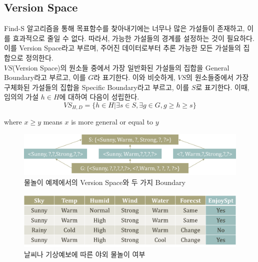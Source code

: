 \documentclass[a4paper]{oblivoir}
\begin{document}
\subsection{Version Space}
Find-S 알고리즘을 통해 목표함수를 찾아내기에는 너무나 많은 가설들이 존재하고, 이를 효과적으로 줄일 수 없다. 따라서, 가능한 가설들의 경계를 설정하는 것이 필요하다. 이를 Version Space라고 부르며, 주어진 데이터로부터 추론 가능한 모든 가설들의 집합으로 정의한다. \\
\indent \textbf{$VS$}(Version Space)의 원소들 중에서 가장 일반화된 가설들의 집합을 General Boundary라고 부르고, 이를 \textbf{$G$}라 표기한다. 이와 비슷하게, \textbf{$VS$}의 원소들중에서 가장 구체화된 가설들의 집합을 Specific Boundary라고 부르고, 이를 \textbf{$S$}로 표기한다. 이때, 임의의 가설 \textbf{$h$}$\in H$에 대하여 다음이 성립한다.
\begin{equation}
VS_{H, D} = \{ h \in H | \exists s \in S, \exists g \in G, g \geq h \geq s \} \tag{2-1}
\end{equation}
\begin{center} where $x \geq y$ means $x$ is more general or equal to $y$ \end{center}
\begin{figure}[ht]
\centering
\includegraphics[scale=0.5]{Function_Approximation3.png}
\caption{물놀이 예제에서의 Version Space와 두 가지 Boundary}
\label{Figure 2-4}
\end{figure}

\begin{figure}[ht]
\centering
\includegraphics[scale=0.5]{Table1.png}
\caption{날씨나 기상예보에 따른 야외 물놀이 여부}
\label{Figure 2-5}
\end{figure}

\end{document}
